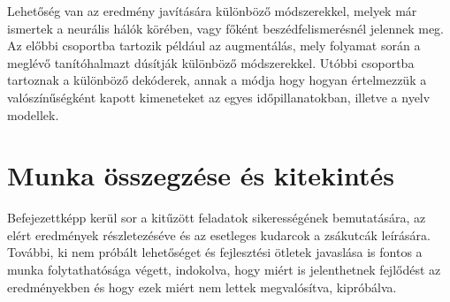 Lehetőség van az eredmény javítására különböző módszerekkel, melyek már ismertek a neurális hálók körében, vagy főként beszédfelismerésnél jelennek meg. Az előbbi csoportba tartozik például az augmentálás, mely folyamat során a meglévő tanítóhalmazt dúsítják különböző módszerekkel. Utóbbi csoportba tartoznak a különböző dekóderek, annak a módja hogy hogyan értelmezzük a valószínűségként kapott kimeneteket az egyes időpillanatokban, illetve a nyelv modellek.

\section{Munka összegzése és kitekintés}

Befejezettképp kerül sor a kitűzött feladatok sikerességének bemutatására, az elért eredmények részletezéséve és az esetleges kudarcok a zsákutcák leírására. További, ki nem próbált lehetőséget és fejlesztési ötletek javaslása is fontos a munka folytathatósága végett, indokolva, hogy miért is jelenthetnek fejlődést az eredményekben és hogy ezek miért nem lettek megvalósítva, kipróbálva.